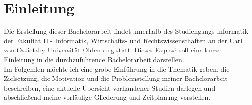 \section{Einleitung}
Die Erstellung dieser Bachelorarbeit findet innerhalb des Studiengangs Informatik der Fakult\"at II - Informatik, Wirtschafts- und Rechtswissenschaften an der Carl von Ossietzky Universit\"at Oldenburg statt.
Dieses Expos\'{e} soll eine kurze Einleitung in die durchzuf\"uhrende Bachelorarbeit darstellen.\\

Im Folgenden m\"ochte ich eine grobe Einf\"uhrung in die Thematik geben, die Zielsetzung, die Motivation und die Problemstellung meiner Bachelorarbeit beschreiben, eine aktuelle \"Ubersicht vorhandener Studien darlegen und abschlie{\ss}end meine vorl\"aufige Gliederung und Zeitplanung vorstellen.